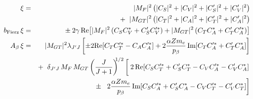 %
%
%
\begin{eqnarray}
    \xi &=& 
    	|M_F|^2    \left( |C_S|^2 + |C_V|^2 + |C_S^\prime|^2 + |C_V^\prime|^2 \right) 
		\nonumber \\ && + \;\; 
		|M_{GT}|^2 \left( |C_T|^2 + |C_A|^2 + |C_T^\prime|^2 + |C_A^\prime|^2 \right)
	\label{eq:jtw_xi} \\
    \bFierz \, \xi &=& \pm \: 2\gamma \, \textrm{Re}\!\left[ |M_F|^2 \left( C_S C_V^* + C_S^\prime C_V^{\prime *} \right) + |M_{GT}|^2 \left( C_T C_A^* + C_T^{\prime} C_A^{\prime *} \right) \right] 
    \label{eq:jtw_bxi} \\
    \Abeta \, \xi &=& |M_{GT}|^2 \lambda_{J^\prime J} \left[ \pm 2 \textrm{Re}\!\left[ C_T C_T^{\prime *} - C_A C_A^{\prime *} \right] + 2 \frac{\alpha Z \me }{\pbeta} \,\textrm{Im}\!\left[ C_T C_A^{\prime *} + C_T^\prime C_A^* \right] \right] 
		\nonumber \\ && + \;\; 
		\delta_{J^\prime J} \, M_F\,M_{GT} \left( \frac{J}{J+1} \right)^{\!\!\! 1/2} \left[ \phantom{\frac{1}{1}\!\!\!} 2 \,\textrm{Re} \! \left[ C_S C_T^{\prime *} +  C_S^\prime C_T^* - C_V C_A^{\prime *} - C_V^\prime C_A^* \right] 
		\right.
		\nonumber \\ && \pm \;\;
		\left.
		2 \frac{\alpha Z \me }{\pbeta} \,\textrm{Im}\!\left[ C_S C_A^{\prime *} + C_S^\prime C_A^* - C_V C_T^{\prime *} -C_V^\prime C_T^* \right] \right]
	\label{eq:jtw_Abetaxi}
\end{eqnarray}
%
%